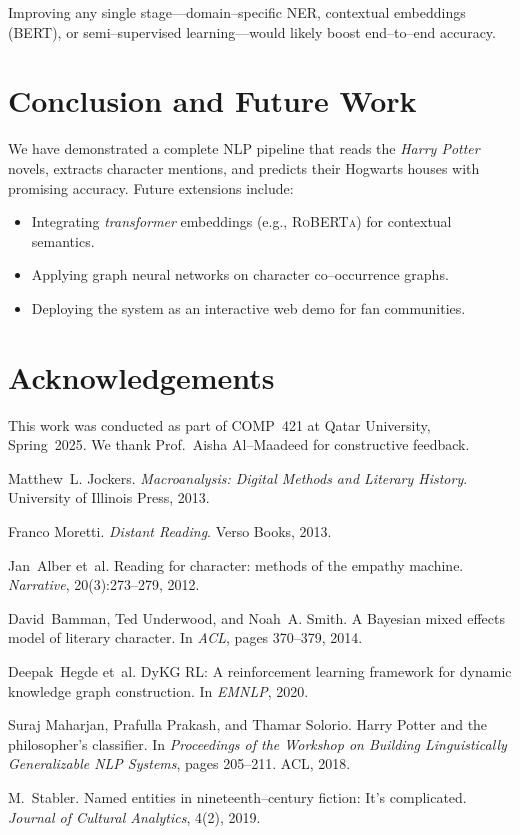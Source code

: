 \documentclass[12pt]{article}
\begin{document}
\noindent
Improving any single stage---domain--specific NER, contextual embeddings (BERT), or semi--supervised learning---would likely boost end--to--end accuracy.

\section{Conclusion and Future Work}
\label{sec:conclusion}
We have demonstrated a complete NLP pipeline that reads the \textit{Harry Potter} novels, extracts character mentions, and predicts their Hogwarts houses with promising accuracy. 
Future extensions include:

\begin{itemize}
\item Integrating \emph{transformer} embeddings (e.g., \textsc{RoBERTa}) for contextual semantics.
\item Applying graph neural networks on character co--occurrence graphs.
\item Deploying the system as an interactive web demo for fan communities.
\end{itemize}

\section*{Acknowledgements}
This work was conducted as part of COMP~421 at Qatar University, Spring~2025. We thank Prof.~Aisha Al--Maadeed for constructive feedback.


\begin{thebibliography}{9}
Matthew~L. Jockers.
\newblock \emph{Macroanalysis: Digital Methods and Literary History}.
\newblock University of Illinois Press, 2013.

Franco Moretti.
\newblock \emph{Distant Reading}.
\newblock Verso Books, 2013.

Jan~Alber et~al.
\newblock Reading for character: methods of the empathy machine.
\newblock \emph{Narrative}, 20(3):273--279, 2012.

David~Bamman, Ted Underwood, and Noah~A. Smith.
\newblock A Bayesian mixed effects model of literary character.
\newblock In \emph{ACL}, pages 370--379, 2014.

Deepak~Hegde et~al.
\newblock DyKG RL: A reinforcement learning framework for dynamic knowledge graph construction.
\newblock In \emph{EMNLP}, 2020.

Suraj Maharjan, Prafulla Prakash, and Thamar Solorio.
\newblock Harry Potter and the philosopher's classifier.
\newblock In \emph{Proceedings of the Workshop on Building Linguistically Generalizable NLP Systems}, pages 205--211. ACL, 2018.

M.~Stabler.
\newblock Named entities in nineteenth--century fiction: It's complicated.
\newblock \emph{Journal of Cultural Analytics}, 4(2), 2019.
\end{thebibliography}
\end{document}
